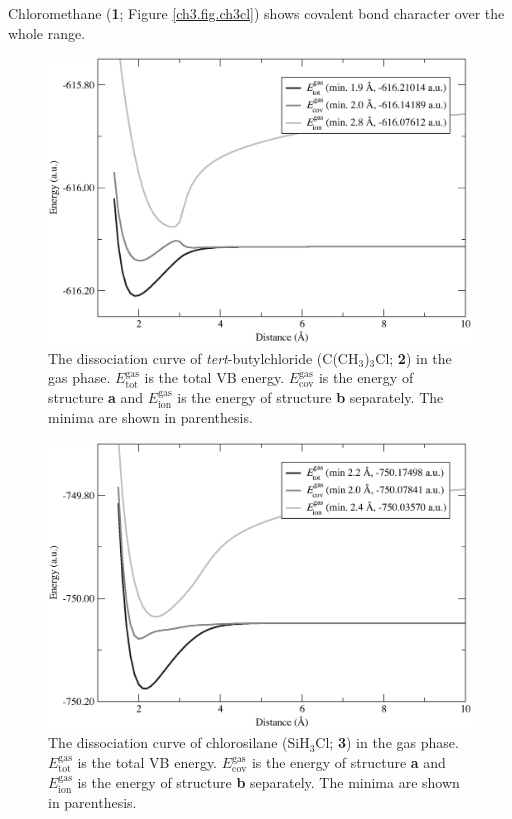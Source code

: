 Chloromethane (\textbf{1}; Figure \ref{ch3.fig.ch3cl}) shows covalent bond character over the whole range.
\begin{figure}[htbp]
\begin{center}
\includegraphics[scale=0.55]{dissociation/figures/c4h9cl_g.eps}
\end{center}
\caption{The dissociation curve of \textit{tert}-butylchloride (C(CH$_3$)$_3$Cl; \textbf{2}) in the gas phase. $E_\mathrm{tot}^\mathrm{gas}$ is the total VB energy. $E_\mathrm{cov}^\mathrm{gas}$ is the energy of structure \textbf{a} and $E_\mathrm{ion}^\mathrm{gas}$ is the energy of structure \textbf{b} separately. The minima are shown in parenthesis.}
\label{ch3.fig.c4h9cl}
\end{figure}
\begin{figure}[htbp]
\begin{center}
\includegraphics[scale=0.55]{dissociation/figures/sih3cl_g.eps}
\end{center}
\caption{The dissociation curve of chlorosilane (SiH$_3$Cl; \textbf{3}) in the gas phase. $E_\mathrm{tot}^\mathrm{gas}$ is the total VB energy. $E_\mathrm{cov}^\mathrm{gas}$ is the energy of structure \textbf{a} and $E_\mathrm{ion}^\mathrm{gas}$ is the energy of structure \textbf{b} separately. The minima are shown in parenthesis.}
\label{ch3.fig.sih3cl}
\end{figure}
